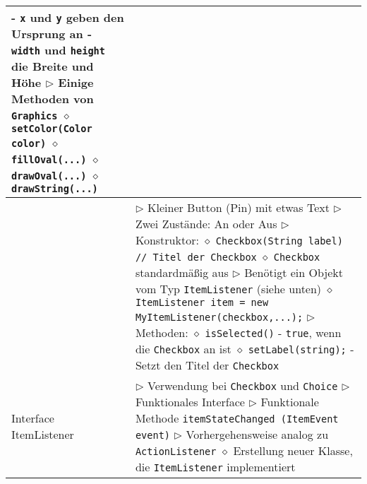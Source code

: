 \begin{longtable}{ | p{} p{} | }
{	\hspace{0.6cm} - \texttt{x} und \texttt{y} geben den Ursprung an \\
	\hspace{0.6cm} - \texttt{width} und \texttt{height} die Breite und Höhe \\
	$\rhd$ Einige Methoden von \texttt{Graphics} \\
	\hspace{0.4cm} $\diamond$ \texttt{setColor(Color color)} \\
	\hspace{0.4cm} $\diamond$ \texttt{fillOval(...)} \\
	\hspace{0.4cm} $\diamond$ \texttt{drawOval(...)} \\
	\hspace{0.4cm} $\diamond$ \texttt{drawString(...)}} \\ \hline

	\makecell[l]{Klasse Checkbox} & \makecell[l]{
	$\rhd$ Kleiner Button (Pin) mit etwas Text \\
	$\rhd$ Zwei Zustände: An oder Aus \\
	$\rhd$ Konstruktor: \\
	\hspace{0.4cm} $\diamond$ \texttt{Checkbox(String label) // Titel der Checkbox} \\
	\hspace{0.4cm} $\diamond$ \texttt{Checkbox} standardmä\ss ig aus \\
	$\rhd$ Benötigt ein Objekt vom Typ \texttt{ItemListener} (siehe unten) \\
	\hspace{0.4cm} $\diamond$ \texttt{ItemListener item = new MyItemListener(checkbox,...);} \\
	$\rhd$ Methoden: \\
	\hspace{0.4cm} $\diamond$ \texttt{isSelected()} \\
	\hspace{0.6cm} - \texttt{true}, wenn die \texttt{Checkbox} an ist \\
	\hspace{0.4cm} $\diamond$ \texttt{setLabel(string);} \\
	\hspace{0.6cm} - Setzt den Titel der \texttt{Checkbox}} \\ \hline

	\makecell[l]{Interface \\ ItemListener} & \makecell[l]{
	$\rhd$ Verwendung bei \texttt{Checkbox} und \texttt{Choice} \\
	$\rhd$ Funktionales Interface \\
	$\rhd$ Funktionale Methode \texttt{itemStateChanged (ItemEvent event)} \\
	$\rhd$ Vorhergehensweise analog zu \texttt{ActionListener} \\
	\hspace{0.4cm} $\diamond$ Erstellung neuer Klasse, die \texttt{ItemListener} implementiert} \\ \hline


\end{longtable}
